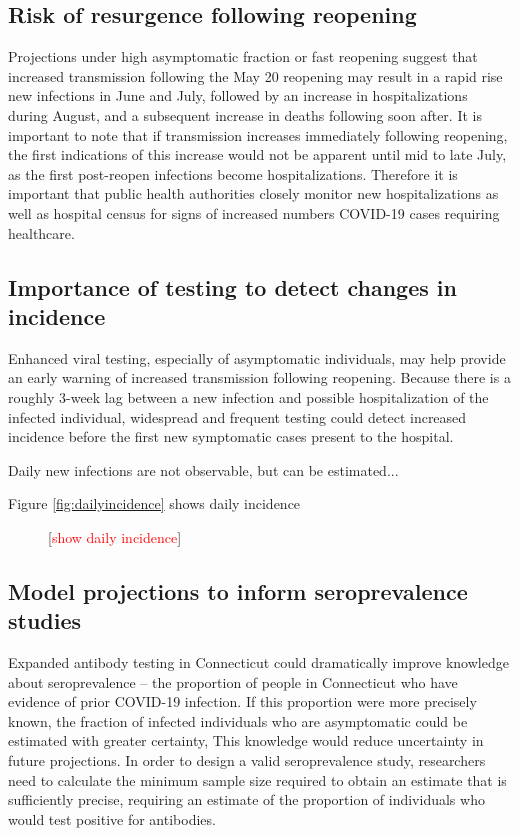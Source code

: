 \documentclass[11pt]{article}
\newcommand{\comment}[1]{[\textcolor{red}{#1}]}
\begin{document}
\subsection*{Risk of resurgence following reopening} 

Projections under high asymptomatic fraction or fast reopening suggest that increased transmission following the May 20 reopening may result in a rapid rise new infections in June and July, followed by an increase in hospitalizations during August, and a subsequent increase in deaths following soon after.  It is important to note that if transmission increases immediately following reopening, the first indications of this increase would not be apparent until mid to late July, as the first post-reopen infections become hospitalizations.  Therefore it is important that public health authorities closely monitor new hospitalizations as well as hospital census for signs of increased numbers COVID-19 cases requiring healthcare.   


\subsection*{Importance of testing to detect changes in incidence}

Enhanced viral testing, especially of asymptomatic individuals, may help provide an early warning of increased transmission following reopening.  Because there is a roughly 3-week lag between a new infection and possible hospitalization of the infected individual, widespread and frequent testing could detect increased incidence before the first new symptomatic cases present to the hospital.  

Daily new infections are not observable, but can be estimated...

Figure \ref{fig:dailyincidence} shows daily incidence 




\begin{figure}
\centering
\caption{\comment{show daily incidence}}
\label{fig:dailyncidence}
\end{figure}




\subsection*{Model projections to inform seroprevalence studies}

Expanded antibody testing in Connecticut could dramatically improve knowledge about seroprevalence -- the proportion of people in Connecticut who have evidence of prior COVID-19 infection. If this proportion were more precisely known, the fraction of infected individuals who are asymptomatic could be estimated with greater certainty,   This knowledge would reduce uncertainty in future projections.  In order to design a valid seroprevalence study, researchers need to calculate the minimum sample size required to obtain an estimate that is sufficiently precise, requiring an estimate of the proportion of individuals who would test positive for antibodies. 
\end{document}
